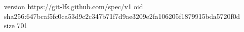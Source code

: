 version https://git-lfs.github.com/spec/v1
oid sha256:647bcaf5fc0ca53d9c2c347b71f7d9ae3209e2fa106205f1879915bda5720f0d
size 701
